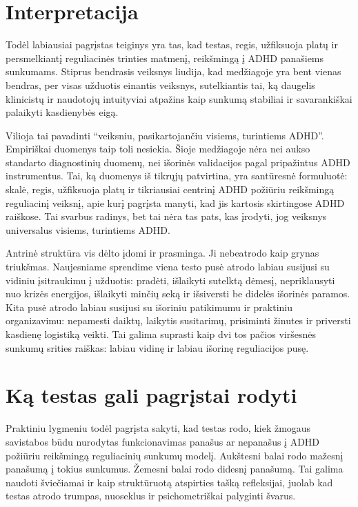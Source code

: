 \documentclass[11pt,a4paper]{article}
\begin{document}
\section{Interpretacija}
Todėl labiausiai pagrįstas teiginys yra tas, kad testas, regis, užfiksuoja platų ir persmelkiantį reguliacinės trinties matmenį, reikšmingą į ADHD panašiems sunkumams. Stiprus bendrasis veiksnys liudija, kad medžiagoje yra bent vienas bendras, per visas užduotis einantis veiksnys, sutelkiantis tai, ką daugelis klinicistų ir naudotojų intuityviai atpažins kaip sunkumą stabiliai ir savarankiškai palaikyti kasdienybės eigą.

Vilioja tai pavadinti ``veiksniu, pasikartojančiu visiems, turintiems ADHD''. Empiriškai duomenys taip toli nesiekia. Šioje medžiagoje nėra nei aukso standarto diagnostinių duomenų, nei išorinės validacijos pagal pripažintus ADHD instrumentus. Tai, ką duomenys iš tikrųjų patvirtina, yra santūresnė formuluotė: skalė, regis, užfiksuoja platų ir tikriausiai centrinį ADHD požiūriu reikšmingą reguliacinį veiksnį, apie kurį pagrįsta manyti, kad jis kartosis skirtingose ADHD raiškose. Tai svarbus radinys, bet tai nėra tas pats, kas įrodyti, jog veiksnys universalus visiems, turintiems ADHD.

Antrinė struktūra vis dėlto įdomi ir prasminga. Ji nebeatrodo kaip grynas triukšmas. Naujesniame sprendime viena testo pusė atrodo labiau susijusi su vidiniu įsitraukimu į užduotis: pradėti, išlaikyti sutelktą dėmesį, nepriklausyti nuo krizės energijos, išlaikyti minčių seką ir išsiversti be didelės išorinės paramos. Kita pusė atrodo labiau susijusi su išoriniu patikimumu ir praktiniu organizavimu: nepamesti daiktų, laikytis susitarimų, prisiminti žinutes ir priversti kasdienę logistiką veikti. Tai galima suprasti kaip dvi tos pačios viršesnės sunkumų srities raiškas: labiau vidinę ir labiau išorinę reguliacijos pusę.

\section{Ką testas gali pagrįstai rodyti}
Praktiniu lygmeniu todėl pagrįsta sakyti, kad testas rodo, kiek žmogaus savistabos būdu nurodytas funkcionavimas panašus ar nepanašus į ADHD požiūriu reikšmingą reguliacinių sunkumų modelį. Aukštesni balai rodo mažesnį panašumą į tokius sunkumus. Žemesni balai rodo didesnį panašumą. Tai galima naudoti šviečiamai ir kaip struktūruotą atspirties tašką refleksijai, juolab kad testas atrodo trumpas, nuoseklus ir psichometriškai palyginti švarus.
\end{document}
